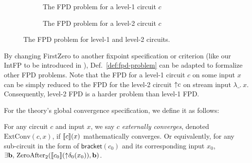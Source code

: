 \begin{figure}[t]
    \centering
    \begin{subfigure}[b]{0.45\textwidth}
        \centering
        \caption{The FPD problem for a level-1 circuit $c$}
        \label{fig:fpd-1}
    \end{subfigure}
    \hfill
    \begin{subfigure}[b]{0.45\textwidth}
        \centering
        \caption{The FPD problem for a level-2 circuit $c$}
        \label{fig:fpd-2}
    \end{subfigure}
    \caption{The FPD problem for level-1 and level-2 circuits.}
    \label{fig:fpd-ckt}
\end{figure}
By changing FirstZero to
another
fixpoint specification or criterion (like our IntFP to be introduced in ), Def.~\ref{def:fpd-problem} can be adapted to formalize other FPD problems.
Note that the FPD for a level-1 circuit $c$ on some input $x$ can be simply reduced to the FPD for the level-2 circuit ${\uparrow}c$ on stream input $\lambda\_.\ x$.
Consequently,
level-2 FPD is a harder problem than level-1 FPD.

For the theory's global convergence specification, we define it as follows:
\begin{definition}
    For any circuit $c$ and input $x$, we say $c$ \emph{externally converges}, denoted $\text{ExtConv}(c, x)$, if $\llbracket c \rrbracket(x)$ mathematically converges. Or equivalently, for any sub-circuit in the form of $\mathsf{bracket}(c_0)$ and its corresponding input $x_0$, $\exists \mathbf{b},\, \text{ZeroAfter}_2(\llbracket c_0 \rrbracket({\uparrow}\delta_0(x_0)), \mathbf{b})$.
\end{definition}


